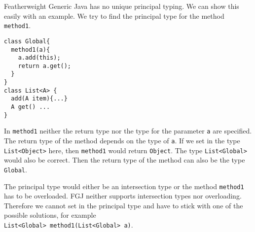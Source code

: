 

Featherweight Generic Java has no unique principal typing.
We can show this easily with an example.
We try to find the principal type for the method \texttt{method1}.
\begin{lstlisting}
class Global{
  method1(a){
    a.add(this);
    return a.get();
  }
}
class List<A> {
  add(A item){...}
  A get() ...
}
\end{lstlisting}
In \texttt{method1} neither the return type nor the type for the parameter \texttt{a} are specified.
The return type of the method depends on the type of \texttt{a}.
If we set in the type \texttt{List<Object>} here, then \texttt{method1} would return \texttt{Object}.
The type \texttt{List<Global>} would also be correct.
Then the return type of the method can also be the type \texttt{Global}.

The principal type would either be an intersection type or the method \texttt{method1} has to be overloaded.
FGJ neither supports intersection types nor overloading.
Therefore we cannot set in the principal type and have to stick with one of the possible solutions,
for example\\
\texttt{List<Global> method1(List<Global> a)}.

